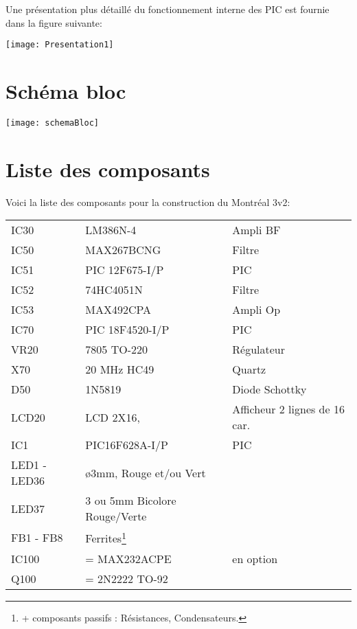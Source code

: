 Une présentation plus détaillé du fonctionnement interne des PIC est fournie dans la figure suivante:


\texttt{[image: Presentation1]}



\section{Schéma bloc}

\texttt{[image: schemaBloc]}

\section{Liste des composants}
Voici la liste des composants pour la construction du Montréal 3v2:

\begin{tabular}{ l l l}

IC30&          LM386N-4&                  Ampli BF\\
IC50&          MAX267BCNG&          Filtre\\
IC51& PIC  12F675-I/P& PIC \\
IC52&          74HC4051N&               Filtre\\
IC53&          MAX492CPA &            Ampli Op\\
IC70& PIC  18F4520-I/P& PIC\\
VR20 &       7805 TO-220  &            Régulateur\\
X70&           20 MHz  HC49&           Quartz\\
D50&           1N5819       &                Diode Schottky\\
LCD20&      LCD 2X16,&                 Afficheur 2 lignes de 16 car.\\
IC1& PIC16F628A-I/P& PIC\\
LED1 - LED36& ø3mm, Rouge et/ou Vert&\\
LED37&                        3 ou 5mm Bicolore Rouge/Verte &\\
FB1 - FB8&                   Ferrites\footnote{+ composants passifs : Résistances, Condensateurs.}&\\
IC100&        = MAX232ACPE&        en option\\
Q100 &        = 2N2222 TO-92&\\
\end{tabular}


